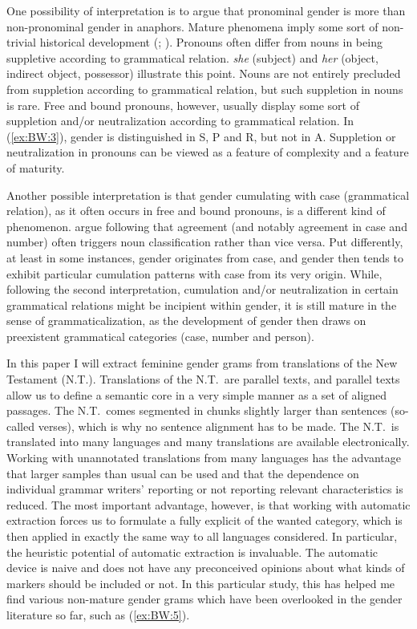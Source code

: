 \documentclass[output=collectionpaper]{langsci/langscibook}
\begin{document}
One possibility of interpretation is to argue that pronominal gender is more  than non-pronominal gender in anaphors. Mature phenomena imply some sort of non-trivial historical development (\citealt[2]{Dahl2004}; \citealt{Trudgill2011}). Pronouns often differ from nouns in being suppletive according to grammatical relation.  \textit{she} (subject) and \textit{her} (object, indirect object, possessor) illustrate this point. Nouns are not entirely precluded from suppletion according to grammatical relation, but such suppletion in nouns is rare. Free and bound pronouns, however, usually display some sort of suppletion and/or neutralization according to grammatical relation. In  (\ref{ex:BW:3}), gender is distinguished in S, P and R, but not in A. Suppletion or neutralization in pronouns can be viewed as a feature of complexity and a feature of maturity.

Another possible interpretation is that gender cumulating with case (grammatical relation), as it often occurs in free and bound pronouns, is a different kind of phenomenon.  argue following \cite[142]{Nichols1992} that agreement (and notably agreement in case and number) often triggers noun classification rather than vice versa. Put differently, at least in some instances, gender originates from case, and gender then tends to exhibit particular cumulation patterns with case from its very origin. While, following the second interpretation, cumulation and/or neutralization in certain grammatical relations might be incipient within gender, it is still mature in the sense of grammaticalization, as the development of gender then draws on preexistent grammatical categories (case, number and person).

In this paper I will extract feminine gender grams from translations of the New Testament (N.T.). Translations of the N.T.\ are parallel texts, and parallel texts allow us to define a semantic core in a very simple manner as a set of aligned passages. The N.T.\ comes segmented in chunks slightly larger than sentences (so-called verses), which is why no sentence alignment has to be made. The N.T.\ is translated into many languages and many translations are available electronically. Working with unannotated translations from many languages has the advantage that larger samples than usual can be used and that the dependence on individual grammar writers’ reporting or not reporting relevant characteristics is reduced. The most important advantage, however, is that working with automatic extraction forces us to formulate a fully explicit  of the wanted category, which is then applied in exactly the same way to all languages considered. In particular, the heuristic potential of automatic extraction is invaluable. The automatic device is naive and does not have any preconceived opinions about what kinds of markers should be included or not. In this particular study, this has helped me find various non-mature gender grams which have been overlooked in the gender literature so far, such as  (\ref{ex:BW:5}).
\end{document}
